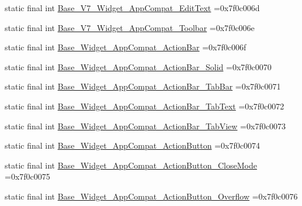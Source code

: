 \begin{DoxyCompactItemize}
\item 
static final int \mbox{\hyperlink{classbr_1_1unb_1_1cic_1_1mp_1_1marketmaster_1_1test_1_1R_1_1style_abeebc016f1775be6863619ba81d37a5c}{Base\+\_\+\+V7\+\_\+\+Widget\+\_\+\+App\+Compat\+\_\+\+Edit\+Text}} =0x7f0c006d
\item 
static final int \mbox{\hyperlink{classbr_1_1unb_1_1cic_1_1mp_1_1marketmaster_1_1test_1_1R_1_1style_a44991fd01e3859562871e3fb8060bb16}{Base\+\_\+\+V7\+\_\+\+Widget\+\_\+\+App\+Compat\+\_\+\+Toolbar}} =0x7f0c006e
\item 
static final int \mbox{\hyperlink{classbr_1_1unb_1_1cic_1_1mp_1_1marketmaster_1_1test_1_1R_1_1style_ad0e4d8f4b1194f5da4246dcfdf384bf8}{Base\+\_\+\+Widget\+\_\+\+App\+Compat\+\_\+\+Action\+Bar}} =0x7f0c006f
\item 
static final int \mbox{\hyperlink{classbr_1_1unb_1_1cic_1_1mp_1_1marketmaster_1_1test_1_1R_1_1style_a673d6faadc85c34bca333901ef740626}{Base\+\_\+\+Widget\+\_\+\+App\+Compat\+\_\+\+Action\+Bar\+\_\+\+Solid}} =0x7f0c0070
\item 
static final int \mbox{\hyperlink{classbr_1_1unb_1_1cic_1_1mp_1_1marketmaster_1_1test_1_1R_1_1style_a8b84445d3f09536cd4da178b7dbf9037}{Base\+\_\+\+Widget\+\_\+\+App\+Compat\+\_\+\+Action\+Bar\+\_\+\+Tab\+Bar}} =0x7f0c0071
\item 
static final int \mbox{\hyperlink{classbr_1_1unb_1_1cic_1_1mp_1_1marketmaster_1_1test_1_1R_1_1style_a033b63aff6dcc62b90a4e218c6518204}{Base\+\_\+\+Widget\+\_\+\+App\+Compat\+\_\+\+Action\+Bar\+\_\+\+Tab\+Text}} =0x7f0c0072
\item 
static final int \mbox{\hyperlink{classbr_1_1unb_1_1cic_1_1mp_1_1marketmaster_1_1test_1_1R_1_1style_a33e02d77dc27de4c0ecba8263010fc14}{Base\+\_\+\+Widget\+\_\+\+App\+Compat\+\_\+\+Action\+Bar\+\_\+\+Tab\+View}} =0x7f0c0073
\item 
static final int \mbox{\hyperlink{classbr_1_1unb_1_1cic_1_1mp_1_1marketmaster_1_1test_1_1R_1_1style_a25abfc054d5789a5ce53f5a1c81edbed}{Base\+\_\+\+Widget\+\_\+\+App\+Compat\+\_\+\+Action\+Button}} =0x7f0c0074
\item 
static final int \mbox{\hyperlink{classbr_1_1unb_1_1cic_1_1mp_1_1marketmaster_1_1test_1_1R_1_1style_a9aa913197392ec06fbfb19785b4a3df9}{Base\+\_\+\+Widget\+\_\+\+App\+Compat\+\_\+\+Action\+Button\+\_\+\+Close\+Mode}} =0x7f0c0075
\item 
static final int \mbox{\hyperlink{classbr_1_1unb_1_1cic_1_1mp_1_1marketmaster_1_1test_1_1R_1_1style_ab7786f6e132f2d0b6db59697bf62e3b0}{Base\+\_\+\+Widget\+\_\+\+App\+Compat\+\_\+\+Action\+Button\+\_\+\+Overflow}} =0x7f0c0076

\end{DoxyCompactItemize}
